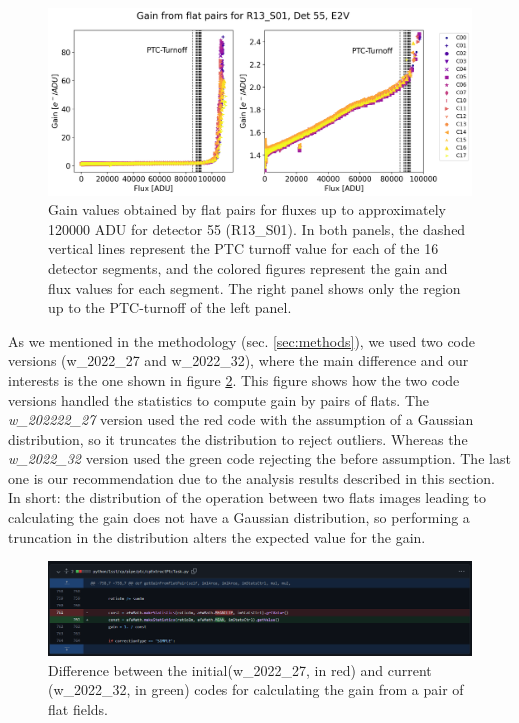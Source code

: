  \begin{figure}[!htb]
    \centering
    \includegraphics[width=\textwidth]{Figures/Gain_plot_55.png}
    \caption{Gain values obtained by flat pairs for fluxes up to approximately 120000 ADU for detector 55 (R13\_S01). In both panels, the dashed vertical lines represent the PTC turnoff value for each of the 16 detector segments, and the colored figures represent the gain and flux values for each segment. The right panel shows only the region up to the PTC-turnoff of the left panel.}
    \label{fig:Gain_full}
\end{figure}

\vspace{3mm}

As we mentioned in the methodology (sec. \ref{sec:methods}), we used two code versions (w\_2022\_27 and w\_2022\_32), where the main difference and our interests is the one shown in figure \ref{fig:diff_codes}. This figure shows how the two code versions handled the statistics to compute gain by pairs of flats. The \textit{w\_202222\_27} version used the red code with the assumption of a Gaussian distribution, so it truncates the distribution to reject outliers. Whereas the \textit{w\_2022\_32} version used the green code rejecting the before assumption. The last one is our recommendation due to the analysis results described in this section. In short: the distribution of the operation between two flats images leading to calculating the gain does not have a Gaussian distribution, so performing a truncation in the distribution alters the expected value for the gain.


\begin{figure}[!htb]
    \centering
    \includegraphics[width=\textwidth]{Figures/Cambio_codigo.png}
    \caption{Difference between the initial(w\_2022\_27, in red) and current (w\_2022\_32, in green) codes for calculating the gain from a pair of flat fields.}
    \label{fig:diff_codes}
\end{figure}

